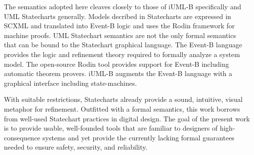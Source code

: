 The semantics adopted here cleaves closely to those of iUML-B
specifically and UML Statecharts\cite{Alexandre} generally. Models
decribed in Statecharts are expressed in SCXML and translated into
Event-B logic and uses the Rodin framework\cite{Abrial} for machine
proofs.  UML Statechart semantics are not the only formal semantics
that can be bound to the Statechart graphical
language\cite{Eshuis_2009}.
%
The Event-B language
\cite{abrial10:_model_event_b} provides the logic and refinement
theory required to formally analyze a system model.  The open-source
Rodin tool \cite{abrial10:_rodin} provides support for Event-B
including automatic theorem provers.  iUML-B \cite{snook14:_b_statem}
augments the Event-B language with a graphical interface including
state-machines.  

With suitable restrictions, Statecharts already provide a sound,
intuitive, visual metaphor for refinement. Outfitted with a formal
semantics, this work borrows from well-used Statechart practices in
digital design.  The goal of the present work is to provide usable,
well-founded tools that are familiar to designers of high-consequence
systems and yet provide the currently lacking formal guarantees needed
to ensure safety, security, and reliability.
